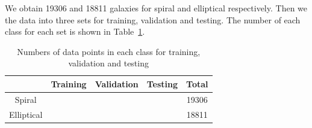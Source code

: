 We obtain 19306 and 18811 galaxies for spiral and elliptical respectively. Then we  the data into three sets for training, validation and testing. The number of each class for each set is shown in Table~\ref{tab:dataset}.
\begin{table}[]
	\centering
	\begin{tabular}{@{}ccccc@{}}
		\toprule
		& Training              & Validation            & Testing               & Total                 \\ \midrule
		\multicolumn{1}{|c|}{Spiral}     & \multicolumn{1}{c|}{} & \multicolumn{1}{c|}{} & \multicolumn{1}{c|}{} & \multicolumn{1}{c|}{19306} \\ \midrule
		\multicolumn{1}{|c|}{Elliptical} & \multicolumn{1}{c|}{} & \multicolumn{1}{c|}{} & \multicolumn{1}{c|}{} & \multicolumn{1}{c|}{18811} \\  \bottomrule
	\end{tabular}
\caption{Numbers of data points in each class for training, validation and testing}
\label{tab:dataset}
\end{table}
